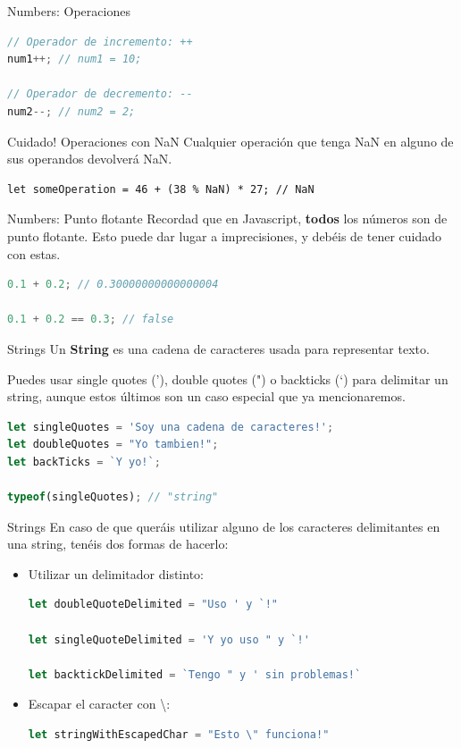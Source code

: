 \documentclass{beamer}
\begin{document}
\begin{frame}[fragile]{Numbers: Operaciones}
\begin{lstlisting}[language=JavaScript]
// Operador de incremento: ++
num1++; // num1 = 10;

// Operador de decremento: --
num2--; // num2 = 2;
\end{lstlisting}

\begin{block}{Cuidado! Operaciones con NaN}
Cualquier operación que tenga NaN en alguno de sus operandos devolverá NaN. 
\begin{lstlisting}
let someOperation = 46 + (38 % NaN) * 27; // NaN
\end{lstlisting}
\end{block}
\end{frame}

\begin{frame}[fragile]{Numbers: Punto flotante}
Recordad que en Javascript, \textbf{todos} los números son de punto flotante. Esto puede dar lugar a imprecisiones, y debéis de tener cuidado con estas.

\begin{lstlisting}[language=JavaScript]
0.1 + 0.2; // 0.30000000000000004

0.1 + 0.2 == 0.3; // false
\end{lstlisting}
\end{frame}

\begin{frame}[fragile]{Strings}
Un \textbf{String} es una cadena de caracteres usada para representar texto.

Puedes usar single quotes ('), double quotes (") o backticks (`) para delimitar un string, aunque estos últimos son un caso especial que ya mencionaremos.

\begin{lstlisting}[language=JavaScript]
let singleQuotes = 'Soy una cadena de caracteres!';
let doubleQuotes = "Yo tambien!";
let backTicks = `Y yo!`;

typeof(singleQuotes); // "string"
\end{lstlisting}
\end{frame}

\begin{frame}[fragile]{Strings}
En caso de que queráis utilizar alguno de los caracteres delimitantes en una string, tenéis dos formas de hacerlo:
\begin{itemize}
\item Utilizar un delimitador distinto: 
\begin{lstlisting}[language=JavaScript]
let doubleQuoteDelimited = "Uso ' y `!"

let singleQuoteDelimited = 'Y yo uso " y `!'

let backtickDelimited = `Tengo " y ' sin problemas!`
\end{lstlisting}
\item Escapar el caracter con \textbackslash:
\begin{lstlisting}[language=JavaScript]
let stringWithEscapedChar = "Esto \" funciona!"
\end{lstlisting}
\end{itemize}
\end{frame}
\end{document}

